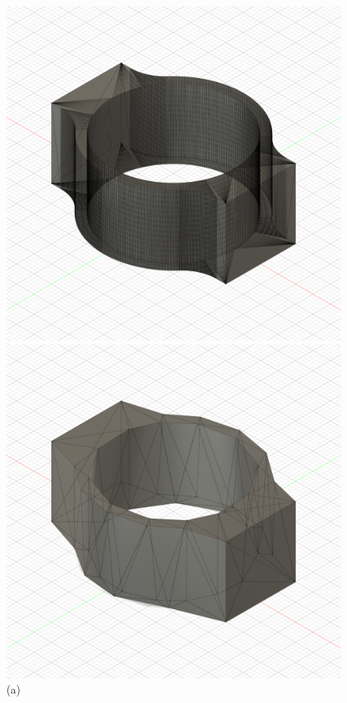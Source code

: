 \begin{figure}[H]
    \centering
    \begin{minipage}{0.32\textwidth}
        \centering
        \includegraphics[width=\linewidth]{images/image_demo.PNG} %
        \caption*{(a)}
    \end{minipage}\hfill
    \begin{minipage}{0.32\textwidth}
        \centering
        \includegraphics[width=\linewidth]{images/image_demo_medium.PNG} %

\end{minipage}
\end{figure}
